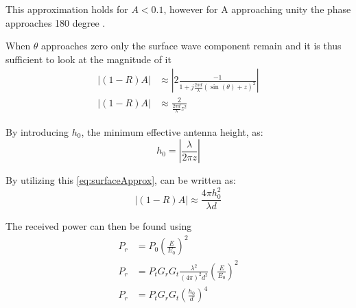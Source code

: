 This approximation holds for $A<0.1$, however for A approaching unity the phase approaches 180 degree \citep{Bullington}. 

When $\theta$ approaches zero only the surface wave component remain and it is thus sufficient to look at the magnitude of it \citep{Chong}
\begin{align}
|(1-R)A| &\approx \left|2 \frac{-1}{1+j\frac{2\pi d}{\lambda}\left(\sin(\theta)+z\right)^2} \right| \\
|(1-R)A| &\approx \frac{2}{\frac{2\pi d}{\lambda}z^2} \label{eq:surfaceApprox}
\end{align}

By introducing $h_0$, the minimum effective antenna height, as:
\begin{equation}
h_0=\left| \frac{\lambda}{2\pi z} \right|
\end{equation} 
\begin{where}
\end{where}

By utilizing this \autoref{eq:surfaceApprox}, can be written as:
\begin{equation}
|(1-R)A| \approx \frac{4 \pi h_0^2}{\lambda d}
\end{equation}

The received power can then be found using \citep{Chong}
\begin{align}
P_r&=P_0 \left(\frac{E}{E_0}\right)^2 \\
P_r&=P_tG_rG_t\frac{\lambda^2}{(4\pi )^2 d^2} \left(\frac{E}{E_0}\right)^2\\
P_r&=P_tG_rG_t\left(\frac{h_0}{d}\right)^4
\end{align}
\begin{where}
\end{where}


















